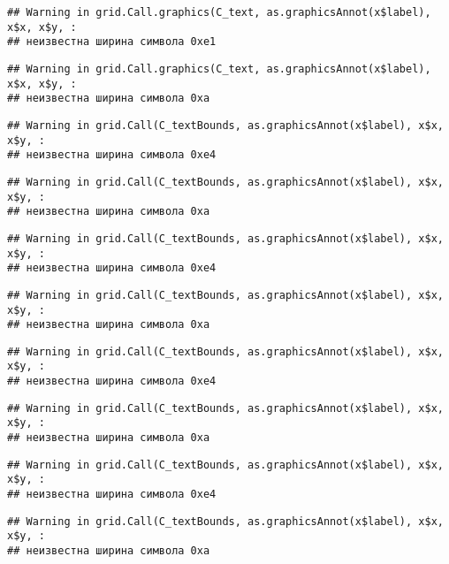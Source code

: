 \documentclass[
]{article}
\begin{document}
\begin{verbatim}
## Warning in grid.Call.graphics(C_text, as.graphicsAnnot(x$label), x$x, x$y, :
## неизвестна ширина символа 0xe1
\end{verbatim}

\begin{verbatim}
## Warning in grid.Call.graphics(C_text, as.graphicsAnnot(x$label), x$x, x$y, :
## неизвестна ширина символа 0xa
\end{verbatim}

\begin{verbatim}
## Warning in grid.Call(C_textBounds, as.graphicsAnnot(x$label), x$x, x$y, :
## неизвестна ширина символа 0xe4
\end{verbatim}

\begin{verbatim}
## Warning in grid.Call(C_textBounds, as.graphicsAnnot(x$label), x$x, x$y, :
## неизвестна ширина символа 0xa
\end{verbatim}

\begin{verbatim}
## Warning in grid.Call(C_textBounds, as.graphicsAnnot(x$label), x$x, x$y, :
## неизвестна ширина символа 0xe4
\end{verbatim}

\begin{verbatim}
## Warning in grid.Call(C_textBounds, as.graphicsAnnot(x$label), x$x, x$y, :
## неизвестна ширина символа 0xa
\end{verbatim}

\begin{verbatim}
## Warning in grid.Call(C_textBounds, as.graphicsAnnot(x$label), x$x, x$y, :
## неизвестна ширина символа 0xe4
\end{verbatim}

\begin{verbatim}
## Warning in grid.Call(C_textBounds, as.graphicsAnnot(x$label), x$x, x$y, :
## неизвестна ширина символа 0xa
\end{verbatim}

\begin{verbatim}
## Warning in grid.Call(C_textBounds, as.graphicsAnnot(x$label), x$x, x$y, :
## неизвестна ширина символа 0xe4
\end{verbatim}

\begin{verbatim}
## Warning in grid.Call(C_textBounds, as.graphicsAnnot(x$label), x$x, x$y, :
## неизвестна ширина символа 0xa
\end{verbatim}
\end{document}
